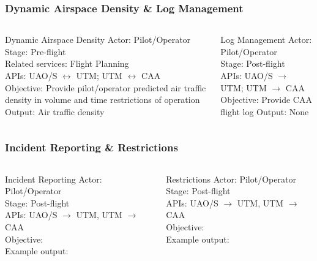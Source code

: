 \documentclass[usenames,dvipsnames,aspectratio=169,serif]{beamer}
\begin{document}
\begin{frame}
   \frametitle{Dynamic Airspace Density \& Log Management}
   \begin{columns}[t]
      \begin{column}{0.5\textwidth}
         \begin{block}{Dynamic Airspace Density}
         Actor: Pilot/Operator \\
         Stage: Pre-flight \\
         Related services: Flight Planning \\
         APIs: UAO/S $\leftrightarrow$ UTM; UTM $\leftrightarrow$ CAA \\
         Objective: Provide pilot/operator predicted air traffic density in volume and time restrictions of operation \\
         Output: Air traffic density
         \end{block}
      \end{column}
      \begin{column}{0.5\textwidth}
         \begin{block}{Log Management}
         Actor: Pilot/Operator \\
         Stage: Post-flight \\
         APIs: UAO/S $\rightarrow$ UTM; UTM $\rightarrow$ CAA \\
         Objective: Provide CAA flight log
         Output: None
         \end{block}
      \end{column}
   \end{columns}
\end{frame}

\begin{frame}
   \frametitle{Incident Reporting \& Restrictions}
   \begin{columns}[t]
      \begin{column}{0.5\textwidth}
         \begin{block}{Incident Reporting}
         Actor: Pilot/Operator \\
         Stage: Post-flight \\
         APIs: UAO/S $\rightarrow$ UTM, UTM $\rightarrow$ CAA \\
         Objective: \\
         Example output: \\
         \end{block}
      \end{column}
      \begin{column}{0.5\textwidth}
         \begin{block}{Restrictions}
         Actor: Pilot/Operator \\
         Stage: Post-flight \\
         APIs: UAO/S $\rightarrow$ UTM, UTM $\rightarrow$ CAA \\
         Objective: \\
         Example output: \\
         \end{block}
      \end{column}
   \end{columns}
\end{frame}
\end{document}

